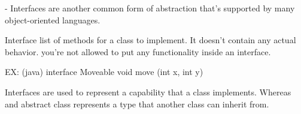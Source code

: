 - Interfaces are another common form of abstraction that's supported by many object-oriented languages. 

Interface 
  list of methods for a class to implement. 
  It doesn't contain any actual behavior.
  you're not allowed to put any functionality inside an interface.

  EX:  (java)
    interface Moveable {
      void move (int x, int y)
    }

Interfaces are used to represent a capability that a class implements. Whereas and abstract class represents a type that another class can inherit from.

